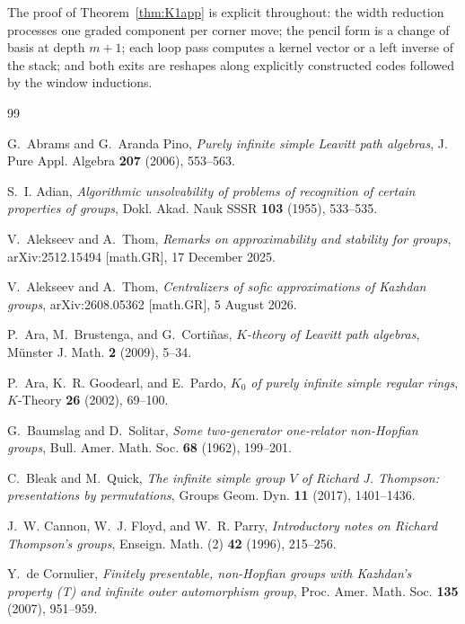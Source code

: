 \documentclass[11pt]{amsart}
\theoremstyle{definition}
\theoremstyle{plain}
\begin{document}
The proof of Theorem~\ref{thm:K1app} is explicit throughout: the width reduction processes one graded component per corner move; the pencil form is a change of basis at depth \(m+1\); each loop pass computes a kernel vector or a left inverse of the stack; and both exits are reshapes along explicitly constructed codes followed by the window inductions.

\begin{thebibliography}{99}

G.~Abrams and G.~Aranda Pino,
\emph{Purely infinite simple Leavitt path algebras},
J. Pure Appl. Algebra \textbf{207} (2006), 553--563.

S.~I. Adian,
\emph{Algorithmic unsolvability of problems of recognition of certain properties of groups},
Dokl. Akad. Nauk SSSR \textbf{103} (1955), 533--535.

V.~Alekseev and A.~Thom,
\emph{Remarks on approximability and stability for groups},
arXiv:2512.15494 [math.GR], 17 December 2025.

V.~Alekseev and A.~Thom,
\emph{Centralizers of sofic approximations of Kazhdan groups},
arXiv:2608.05362 [math.GR], 5 August 2026.

P.~Ara, M.~Brustenga, and G.~Corti\~nas,
\emph{$K$-theory of Leavitt path algebras},
M\"unster J. Math. \textbf{2} (2009), 5--34.

P.~Ara, K.~R. Goodearl, and E.~Pardo,
\emph{$K_0$ of purely infinite simple regular rings},
$K$-Theory \textbf{26} (2002), 69--100.

G.~Baumslag and D.~Solitar,
\emph{Some two-generator one-relator non-Hopfian groups},
Bull. Amer. Math. Soc. \textbf{68} (1962), 199--201.

C.~Bleak and M.~Quick,
\emph{The infinite simple group $V$ of Richard J. Thompson: presentations by permutations},
Groups Geom. Dyn. \textbf{11} (2017), 1401--1436.

J.~W. Cannon, W.~J. Floyd, and W.~R. Parry,
\emph{Introductory notes on Richard Thompson's groups},
Enseign. Math. (2) \textbf{42} (1996), 215--256.

Y.~de Cornulier,
\emph{Finitely presentable, non-Hopfian groups with Kazhdan's property (T)
and infinite outer automorphism group},
Proc. Amer. Math. Soc. \textbf{135} (2007), 951--959.


\end{thebibliography}
\end{document}
